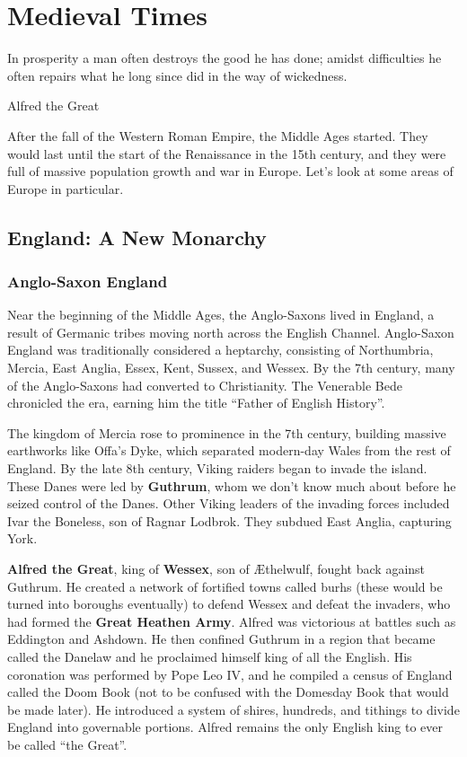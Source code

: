 \chapter{Medieval Times}

\epigraph{%
  In prosperity a man often destroys the good he has done;
  amidst difficulties he often repairs what he long since did in the way of wickedness.
}{Alfred the Great}

After the fall of the Western Roman Empire, the Middle Ages started.
They would last until the start of the Renaissance in the 15th century,
and they were full of massive population growth and war in Europe.
Let's look at some areas of Europe in particular.

\section{England: A New Monarchy}

\subsection*{Anglo-Saxon England}

Near the beginning of the Middle Ages, the Anglo-Saxons lived in England,
a result of Germanic tribes moving north across the English Channel.
Anglo-Saxon England was traditionally considered a heptarchy, consisting of
Northumbria, Mercia, East Anglia, Essex, Kent, Sussex, and Wessex.
By the 7th century, many of the Anglo-Saxons had converted to Christianity.
The Venerable Bede chronicled the era, earning him the title ``Father of English History''.

The kingdom of Mercia rose to prominence in the 7th century,
building massive earthworks like Offa's Dyke,
which separated modern-day Wales from the rest of England.
By the late 8th century, Viking raiders began to invade the island.
These Danes were led by \textbf{Guthrum}, whom we don't know much about before he seized control of the Danes.
Other Viking leaders of the invading forces included Ivar the Boneless, son of Ragnar Lodbrok.
They subdued East Anglia, capturing York.

\textbf{Alfred the Great}, king of \textbf{Wessex}, son of \AE{}thelwulf, fought back against Guthrum.
He created a network of fortified towns called burhs (these would be turned into boroughs eventually)
to defend Wessex and defeat the invaders, who had formed the \textbf{Great Heathen Army}.
Alfred was victorious at battles such as Eddington and Ashdown.
He then confined Guthrum in a region that became called the Danelaw
and he proclaimed himself king of all the English.
His coronation was performed by Pope Leo IV,
and he compiled a census of England called the Doom Book
(not to be confused with the Domesday Book that would be made later).
He introduced a system of shires, hundreds, and tithings to divide England into governable portions.
Alfred remains the only English king to ever be called ``the Great''.

